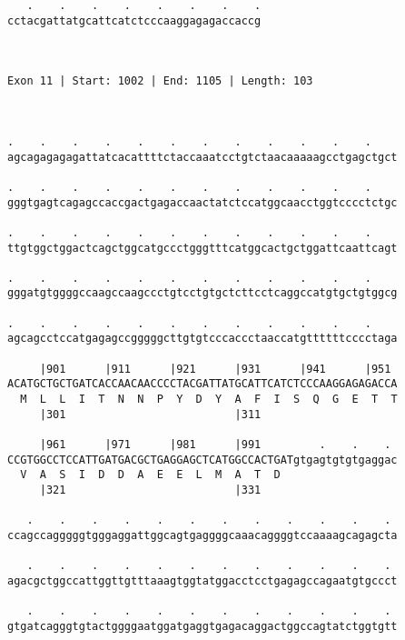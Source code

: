 \documentclass{article}
\begin{document}
\begin{Verbatim}
   .    .    .    .    .    .    .    .
cctacgattatgcattcatctcccaaggagagaccaccg
                                       
                                       
 
Exon 11 | Start: 1002 | End: 1105 | Length: 103



.    .    .    .    .    .    .    .    .    .    .    .    
agcagagagagattatcacattttctaccaaatcctgtctaacaaaaagcctgagctgct
                                                            
.    .    .    .    .    .    .    .    .    .    .    .    
gggtgagtcagagccaccgactgagaccaactatctccatggcaacctggtcccctctgc
                                                            
.    .    .    .    .    .    .    .    .    .    .    .    
ttgtggctggactcagctggcatgccctgggtttcatggcactgctggattcaattcagt
                                                            
.    .    .    .    .    .    .    .    .    .    .    .    
gggatgtggggccaagccaagccctgtcctgtgctcttcctcaggccatgtgctgtggcg
                                                            
.    .    .    .    .    .    .    .    .    .    .    .    
agcagcctccatgagagccgggggcttgtgtcccaccctaaccatgttttttcccctaga
                                                            
     |901      |911      |921      |931      |941      |951 
ACATGCTGCTGATCACCAACAACCCCTACGATTATGCATTCATCTCCCAAGGAGAGACCA
  M  L  L  I  T  N  N  P  Y  D  Y  A  F  I  S  Q  G  E  T  T
     |301                          |311                     
  
     |961      |971      |981      |991         .    .    . 
CCGTGGCCTCCATTGATGACGCTGAGGAGCTCATGGCCACTGATgtgagtgtgtgaggac
  V  A  S  I  D  D  A  E  E  L  M  A  T  D                  
     |321                          |331                     
  
   .    .    .    .    .    .    .    .    .    .    .    . 
ccagccagggggtgggaggattggcagtgaggggcaaacaggggtccaaaagcagagcta
                                                            
   .    .    .    .    .    .    .    .    .    .    .    . 
agacgctggccattggttgtttaaagtggtatggacctcctgagagccagaatgtgccct
                                                            
   .    .    .    .    .    .    .    .    .    .    .    . 
gtgatcagggtgtactggggaatggatgaggtgagacaggactggccagtatctggtgtt
                                                            

\end{Verbatim}
\end{document}
